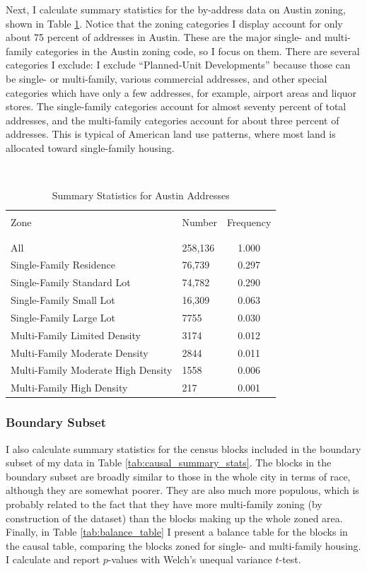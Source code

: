 \documentclass[11pt]{article}
\begin{document}
Next, I calculate summary statistics for the by-address data on Austin zoning, shown in Table \ref{tab:zone_freqs}. Notice that the zoning categories I display account for only about 75 percent of addresses in Austin. These are the major single- and multi-family categories in the Austin zoning code, so I focus on them. There are several categories I exclude: I exclude “Planned-Unit Developments” because those can be single- or multi-family, various commercial addresses, and other special categories which have only a few addresses, for example, airport areas and liquor stores. The single-family categories account for almost seventy percent of total addresses, and the multi-family categories account for about three percent of addresses. This is typical of American land use patterns, where most land is allocated toward single-family housing.

\begin{table}[!htbp] \centering 
  \caption{Summary Statistics for Austin Addresses} 
  \\[1.8ex]  \label{tab:zone_freqs} 
\begin{tabular}{@{\extracolsep{5pt}}llc} 
\hline\hline\\[-1.8ex] 
Zone & Number & Frequency \\
\\[-1.8ex] 
\hline
\\[-1.8ex] 
All & 258,136 & 1.000 \\
Single-Family Residence & 76,739 & 0.297 \\
Single-Family Standard Lot & 74,782 & 0.290 \\
Single-Family Small Lot & 16,309 & 0.063 \\
Single-Family Large Lot & 7755 & 0.030 \\
Multi-Family Limited Density & 3174 & 0.012 \\
Multi-Family Moderate Density & 2844 & 0.011 \\
Multi-Family Moderate High Density & 1558 & 0.006 \\
Multi-Family High Density & 217 & 0.001 \\
\hline\hline
\end{tabular}
\end{table}
\noindent 

\subsubsection{Boundary Subset}

I also calculate summary statistics for the census blocks included in the boundary subset of my data in Table \ref{tab:causal_summary_stats}. The blocks in the boundary subset are broadly similar to those in the whole city in terms of race, although they are somewhat poorer. They are also much more populous, which is probably related to the fact that they have more multi-family zoning (by construction of the dataset) than the blocks making up the whole zoned area. Finally, in Table \ref{tab:balance_table} I present a balance table for the blocks in the causal table, comparing the blocks zoned for single- and multi-family housing. I calculate and report $p$-values with Welch's unequal variance $t$-test.
\end{document}

